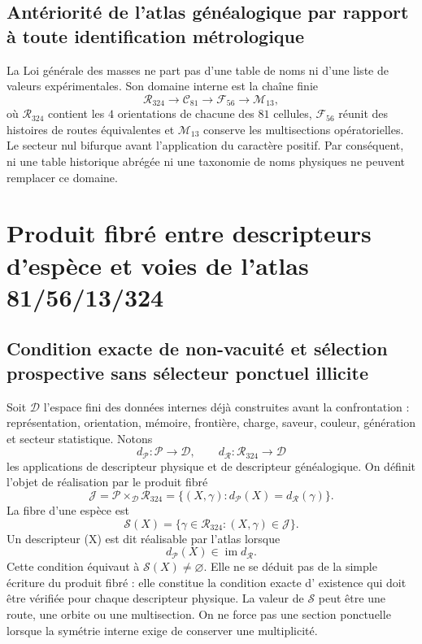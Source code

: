 \subsection{Antériorité de l'atlas généalogique par rapport à toute identification métrologique}

La Loi générale des masses ne part pas d'une table de noms ni d'une liste de
valeurs expérimentales. Son domaine interne est la chaîne finie
\[
 \mathcal R_{324}\longrightarrow \mathcal C_{81}
 \longrightarrow \mathcal F_{56}\longrightarrow \mathcal M_{13},
\]
où \(\mathcal R_{324}\) contient les \(4\) orientations de chacune des
\(81\) cellules, \(\mathcal F_{56}\) réunit des histoires de routes équivalentes et
\(\mathcal M_{13}\) conserve les multisections opératorielles. Le secteur nul
bifurque avant l'application du caractère positif. Par conséquent, ni une table
historique abrégée ni une taxonomie de noms physiques ne peuvent remplacer ce
domaine.

\section{Produit fibré entre descripteurs d'espèce et voies de l'atlas 81/56/13/324}

\subsection{Condition exacte de non-vacuité et sélection prospective sans sélecteur ponctuel illicite}

Soit \(\mathcal D\) l'espace fini des données internes déjà construites avant la
confrontation : représentation, orientation, mémoire, frontière, charge, saveur,
couleur, génération et secteur statistique. Notons
\[
 d_{\mathcal P}:\mathcal P\longrightarrow\mathcal D,
 \qquad
 d_{\mathcal R}:\mathcal R_{324}\longrightarrow\mathcal D
\]
les applications de descripteur physique et de descripteur généalogique. On définit l'objet
de réalisation par le produit fibré
\[
 \mathcal J
 =\mathcal P\times_{\mathcal D}\mathcal R_{324}
 =\{(X,\gamma):d_{\mathcal P}(X)=d_{\mathcal R}(\gamma)\}.
\]
La fibre d'une espèce est
\[
\mathscr S(X)=\{\gamma\in\mathcal R_{324}:(X,\gamma)\in\mathcal J\}.
\]
Un descripteur (X) est dit réalisable par l'atlas lorsque
\[
 d_{\mathcal P}(X)\in\operatorname{im}d_{\mathcal R}.
\]
Cette condition équivaut à \(\mathscr S(X)\ne\varnothing\). Elle ne se déduit pas
de la simple écriture du produit fibré : elle constitue la condition exacte d'
existence qui doit être vérifiée pour chaque descripteur physique.
La valeur de \(\mathscr S\) peut être une route, une orbite ou une multisection.
On ne force pas une section ponctuelle lorsque la symétrie interne exige de conserver
une multiplicité.

